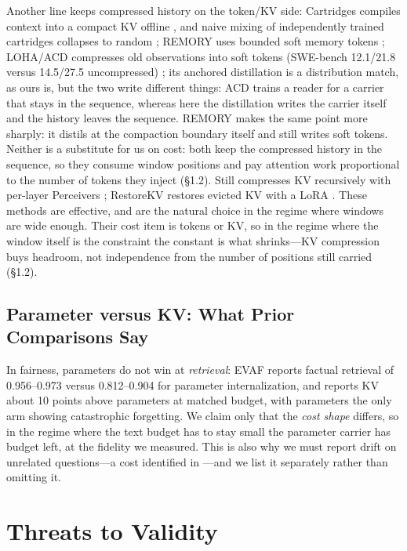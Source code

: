 \documentclass[sigconf,nonacm]{acmart}
\begin{document}
Another line keeps compressed history on the token/KV side: Cartridges compiles context into a compact KV
offline \cite{cartridges2025}, and naive mixing of independently trained cartridges collapses to random
\cite{cartridges_scale2026}; REMORY uses bounded soft memory tokens \cite{remory2026}; LOHA/ACD compresses
old observations into soft tokens (SWE-bench 12.1/21.8 versus 14.5/27.5 uncompressed) \cite{loha2026}; its
anchored distillation is a distribution match, as ours is, but the two write different things: ACD trains a
reader for a carrier that stays in the sequence, whereas here the distillation writes the carrier itself and
the history leaves the sequence. REMORY makes the same point more sharply: it distils at the compaction
boundary itself and still writes soft tokens. Neither is a substitute for us on cost: both keep the compressed
history in the sequence, so they consume window positions and pay attention work proportional to the number of
tokens they inject (\S1.2).
Still compresses KV recursively with per-layer Perceivers \cite{still2026}; RestoreKV restores evicted KV
with a LoRA \cite{restorekv2026}. These methods are effective, and are the natural choice in the regime
where windows are wide enough. Their cost item is tokens or KV, so in the regime where the window itself
is the constraint the constant is what shrinks---KV compression buys headroom, not independence from the number
of positions still carried (\S1.2).

\subsection{Parameter versus KV: What Prior Comparisons Say}

In fairness, parameters do not win at \emph{retrieval}: EVAF \cite{evaf2026} reports factual retrieval of
0.956--0.973 versus 0.812--0.904 for parameter internalization, and \cite{doclive2026} reports KV about
10 points above parameters at matched budget, with parameters the only arm showing catastrophic
forgetting. We claim only that the \emph{cost shape}
differs, so in the regime where the text budget has to stay small the parameter carrier has budget left, at the
fidelity we measured. This is also
why we must report drift on unrelated questions---a cost identified in \cite{doclive2026}---and we list it
separately rather than omitting it.

\section{Threats to Validity}\label{sec:threats}
\end{document}
